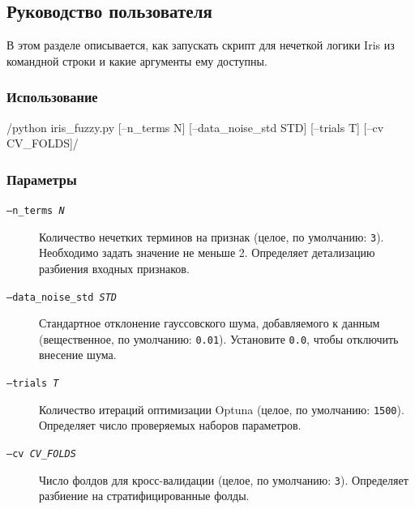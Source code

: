 \subsection{Руководство пользователя}\label{sec:user-guide}

В этом разделе описывается, как запускать скрипт для нечеткой логики Iris из командной строки и какие аргументы ему доступны.

\subsubsection{Использование}
/python iris_fuzzy.py [--n_terms N] [--data_noise_std STD] [--trials T] [--cv CV_FOLDS]/

\subsubsection{Параметры}
\begin{description}
  \item[\texttt{--n\_terms \textit{N}}]  

    
    Количество нечетких терминов на признак (целое, по умолчанию: \texttt{3}).  
    Необходимо задать значение не меньше 2.  
    Определяет детализацию разбиения входных признаков.

  \item[\texttt{--data\_noise\_std \textit{STD}}]  
    
    
    Стандартное отклонение гауссовского шума, добавляемого к данным (вещественное, по умолчанию: \texttt{0.01}).  
    Установите \texttt{0.0}, чтобы отключить внесение шума.

  \item[\texttt{--trials \textit{T}}]  
    
    
    Количество итераций оптимизации Optuna (целое, по умолчанию: \texttt{1500}).  
    Определяет число проверяемых наборов параметров.

  \item[\texttt{--cv \textit{CV\_FOLDS}}]  
    
    
    Число фолдов для кросс-валидации (целое, по умолчанию: \texttt{3}).  
    Определяет разбиение на стратифицированные фолды.
\end{description}


